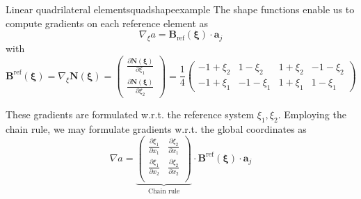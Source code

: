 \begin{example}{Linear quadrilateral elements}{quadshapeexample}
    The shape functions enable us to compute gradients on each reference element as 
    \begin{equation}
        \nabla_\xi a = \mathbf{B}_\textrm{ref}(\pmb{\xi}) \cdot  \mathbf{a}_j
    \end{equation}
    with 
    \begin{equation}
        \mathbf{B}^\textrm{ref}(\pmb{\xi})
        =  \nabla_\xi \mathbf{N}(\pmb{\xi}) 
        = 
        \begin{pmatrix}
            \frac{\partial \mathbf{N}(\pmb{\xi})}{\partial \xi_1} \\ 
            \frac{\partial \mathbf{N}(\pmb{\xi})}{\partial \xi_2} 
        \end{pmatrix} 
        = \frac{1}{4}
        \begin{pmatrix}
            -1 + \xi_2 & 1 - \xi_2 & 1 + \xi_2 & -1 - \xi_2 \\
            -1 + \xi_1 & -1 - \xi_1 & 1 + \xi_1 & 1 - \xi_1
        \end{pmatrix}
    \end{equation}

    These gradients are formulated w.r.t. the reference system $\xi_1, \xi_2$. Employing the chain rule, we may formulate gradients w.r.t. the global coordinates as 
    \begin{equation}
        \nabla a = 
        \underbrace{
        \begin{pmatrix}
            \frac{\partial \xi_1}{\partial x_1} & \frac{\partial \xi_2}{\partial x_1} \\
            \frac{\partial \xi_1}{\partial x_2} & \frac{\partial \xi_2}{\partial x_2} \\
        \end{pmatrix}
        }_\textrm{Chain rule}
        \cdot 
        \mathbf{B}^\textrm{ref}(\pmb{\xi}) \cdot  \mathbf{a}_j
    \end{equation}


\end{example}
